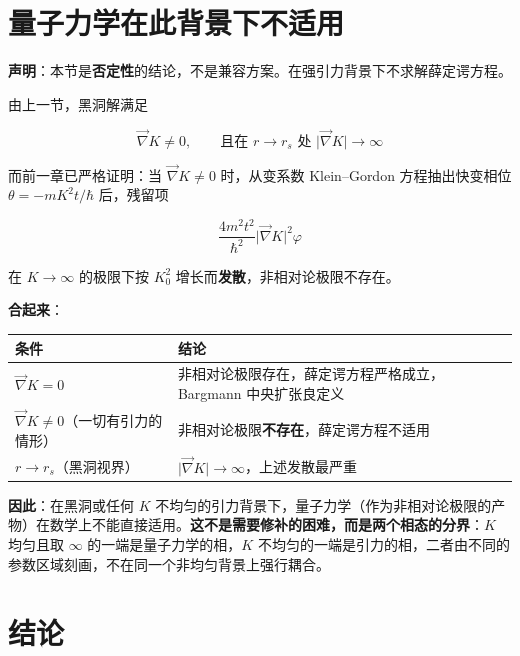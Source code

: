 \documentclass[
  chinese,
  a4paper,
  UTF8,
  12pt,
  oneside,
  openany]{ctexbook}
\newcounter{none} %
\theoremstyle{plain}
\theoremstyle{plain}
\theoremstyle{plain}
\theoremstyle{definition}
\theoremstyle{plain}
\theoremstyle{plain}
\theoremstyle{remark}
\begin{document}
\section{量子力学在此背景下不适用}\label{sec-isg2-qm}

\textbf{声明}：本节是\textbf{否定性}的结论，不是兼容方案。在强引力背景下不求解薛定谔方程。

由上一节，黑洞解满足

\[
\vec\nabla K\neq0,\qquad \text{且在 } r\to r_s \text{ 处 } \lvert\vec\nabla K\rvert\to\infty
\]

而前一章已严格证明：当 \(\vec\nabla K\neq0\) 时，从变系数 Klein--Gordon
方程抽出快变相位 \(\theta=-mK^{2}t/\hbar\) 后，残留项

\[
\frac{4m^{2}t^{2}}{\hbar^{2}}\lvert\vec\nabla K\rvert^{2}\varphi
\]

在 \(K\to\infty\) 的极限下按 \(K_0^{2}\)
增长而\textbf{发散}，非相对论极限不存在。

\textbf{合起来}：

{\def\LTcaptype{none} %
\begin{longtable}[]{@{}
  >{\raggedright\arraybackslash}p{}
  >{\raggedright\arraybackslash}p{}@{}}
\toprule\noalign{}
\begin{minipage}[b]{\linewidth}\raggedright
条件
\end{minipage} & \begin{minipage}[b]{\linewidth}\raggedright
结论
\end{minipage} \\
\midrule\noalign{}
\endhead
\bottomrule\noalign{}
\endlastfoot
\(\vec\nabla K=0\) & 非相对论极限存在，薛定谔方程严格成立，Bargmann
中央扩张良定义 \\
\(\vec\nabla K\neq0\)（一切有引力的情形） &
非相对论极限\textbf{不存在}，薛定谔方程不适用 \\
\(r\to r_s\)（黑洞视界） &
\(\lvert\vec\nabla K\rvert\to\infty\)，上述发散最严重 \\
\end{longtable}
}

\textbf{因此}：在黑洞或任何 \(K\)
不均匀的引力背景下，量子力学（作为非相对论极限的产物）在数学上不能直接适用。\textbf{这不是需要修补的困难，而是两个相态的分界}：\(K\)
均匀且取 \(\infty\) 的一端是量子力学的相，\(K\)
不均匀的一端是引力的相，二者由不同的参数区域刻画，不在同一个非均匀背景上强行耦合。

\section{结论}\label{sec-isg2-conclusion}
\end{document}
